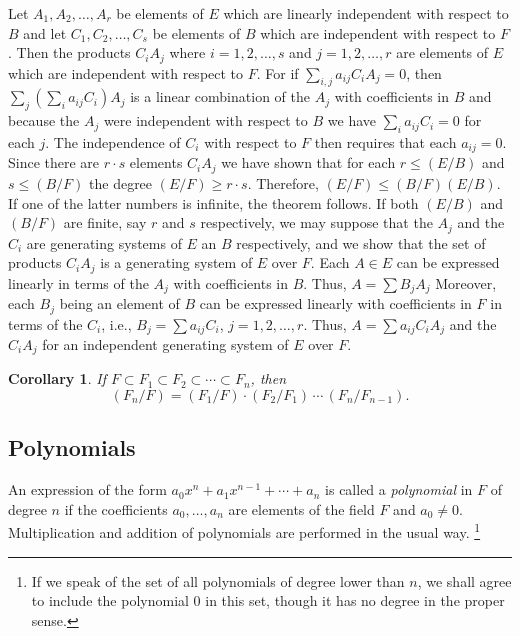 \documentclass[10pt,leqno]{article}
\newtheorem*{coro*}{Corollary}
\theoremstyle{definition}
\begin{document}
Let $A_1, A_2, \ldots, A_r$ be elements of $E$ which are linearly independent with respect to $B$ and let $C_1, C_2, \ldots, C_s$ be elements of $B$ which are independent with respect to $F$.
Then the products $C_i A_j$ where $i = 1,2,\ldots, s$ and $j=1,2,\ldots,r$ are elements of $E$ which are independent with respect to $F$.
For if $\sum_{i,j} a_{ij} C_i A_j = 0$, then
$\sum_j (\sum_i a_{ij} C_i) A_j$ is a linear combination of the $A_j$ with coefficients in $B$ and because the $A_j$ were independent with respect to $B$ we have $\sum_i a_{ij} C_i = 0$ for each $j$.
The independence of $C_i$ with respect to $F$ then requires that each $a_{ij} = 0$.
Since there are $r \cdot s$ elements $C_i A_j$ we have shown that for each $r \leq (E/B)$ and $s \leq (B/F)$ the degree $(E/F) \geq r \cdot s$.
Therefore, $(E/F) \leq (B/F) (E/B)$.
If one of the latter numbers is infinite, the theorem follows.
If both $(E/B)$ and $(B/F)$ are finite, say $r$ and $s$ respectively, we may suppose that the $A_j$ and the $C_i$ are generating systems of $E$ an $B$ respectively, and we show that the set of products $C_i A_j$ is a generating system of $E$ over $F$.
Each $A \in E$ can be expressed linearly in terms of the $A_j$ with coefficients in $B$.
Thus, $A = \sum B_j A_j$
Moreover, each $B_j$ being an element of $B$ can be expressed linearly with coefficients in $F$ in terms of the $C_i$, i.e., $B_j = \sum a_{ij} C_i$, $j=1,2,\ldots,r$.
Thus, $A = \sum a_{ij} C_i A_j$ and the $C_iA_j$ for an independent generating system of $E$ over $F$.


\begin{coro*}
\label{coro:p22}
If $F \subset F_1 \subset F_2 \subset \cdots \subset F_n$, then 
\[
(F_n/F) = (F_1/F) \cdot (F_2/F_1) \, \cdots \, (F_n/F_{n-1}).
\]
\end{coro*}


\subsection{Polynomials}

An expression of the form $a_0 x^n + a_1 x^{n-1} + \cdots + a_n$ is called a \emph{polynomial} in $F$ of degree $n$ if the coefficients $a_0, \ldots, a_n$ are elements of the field $F$ and $a_0 \not= 0$.
Multiplication and addition of polynomials are performed in the usual way.%
\footnote{If we speak of the set of all polynomials of degree lower than $n$, we shall agree to include the polynomial $0$ in this set, though it has no degree in the proper sense.}
\end{document}
